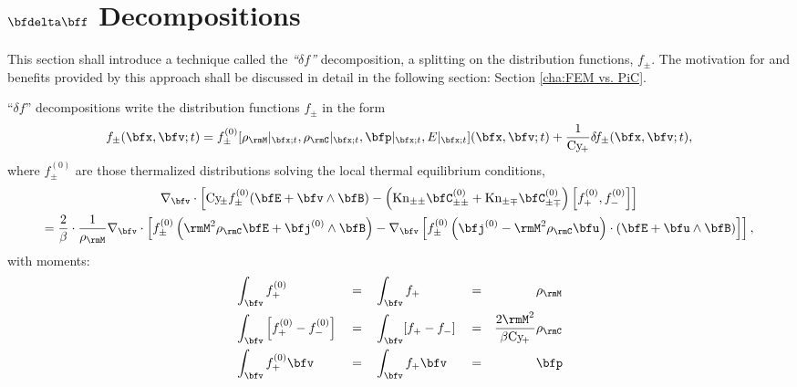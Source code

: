 \section{$\bfdelta\bff$ Decompositions}\label{cha:delta f decompositions}
    This section shall introduce a technique called the \emph{``$\delta\!f$''} decomposition, a splitting on the distribution functions, $f_{\pm}$. The motivation for and benefits provided by this approach shall be discussed in detail in the following section: Section \ref{cha:FEM vs. PiC}.

    \line

    \begin{definition}\label{def:delta f models}
        ``$\delta\!f$'' decompositions write the distribution functions $f_{\pm}$ in the form
        \begin{equation}
            f_{\pm}(\bfx, \bfv; t)  =  f_{\pm}^{(0)}[\rho_{\rmM}|_{\bfx; t}, \rho_{\rmC}|_{\bfx; t}, \bfp|_{\bfx; t}, E|_{\bfx; t}](\bfx, \bfv; t) + \frac{1}{\rmCy\!_{+}}\delta\!f_{\pm}(\bfx, \bfv; t),
        \end{equation}
        where $f_{\pm}^{(0)}$ are those thermalized distributions solving the local thermal equilibrium conditions,
        \begin{multline}\label{eqn:thermal equilibrium identity}
            \nabla_{\bfv}\cdot\left[\rmCy\!_{\pm}f_{\pm}^{(0)}(\bfE + \bfv\wedge\bfB) - \left(\rmKn_{\pm\pm}\bfC_{\pm\pm}^{(0)} + \rmKn_{\pm\mp}\bfC_{\pm\mp}^{(0)}\right)\left[f_{+}^{(0)}, f_{-}^{(0)}\right]\right]  \\
            =  \frac{2}{\beta}\cdot\frac{1}{\rho_{\rmM}}\nabla_{\bfv}\cdot\left[f_{\pm}^{(0)}\left(\rmM^{2}\rho_{\rmC}\bfE + \bfj^{(0)}\wedge\bfB\right) - \nabla_{\bfv}\left[f_{\pm}^{(0)}\left(\bfj^{(0)} - \rmM^{2}\rho_{\rmC}\bfu\right)\cdot\left(\bfE + \bfu\wedge\bfB\right)\right]\right],
        \end{multline}
        with moments:
        \begin{align}
            &\int_{\bfv}f_{+}^{(0)}                             &  &=  &  &\int_{\bfv}f_{+}                         &  &=  &  &\rho_{\rmM}  \\
            &\int_{\bfv}\left[f_{+}^{(0)} - f_{-}^{(0)}\right]  &  &=  &  &\int_{\bfv}[f_{+} - f_{-}]               &  &=  &  \frac{2\rmM^{2}}{\beta\rmCy\!_{+}}&\rho_{\rmC}  \\
            &\int_{\bfv}f_{+}^{(0)}\bfv                         &  &=  &  &\int_{\bfv}f_{+}\bfv                     &  &=  &  &\bfp  \\

\end{align}
\end{definition}
